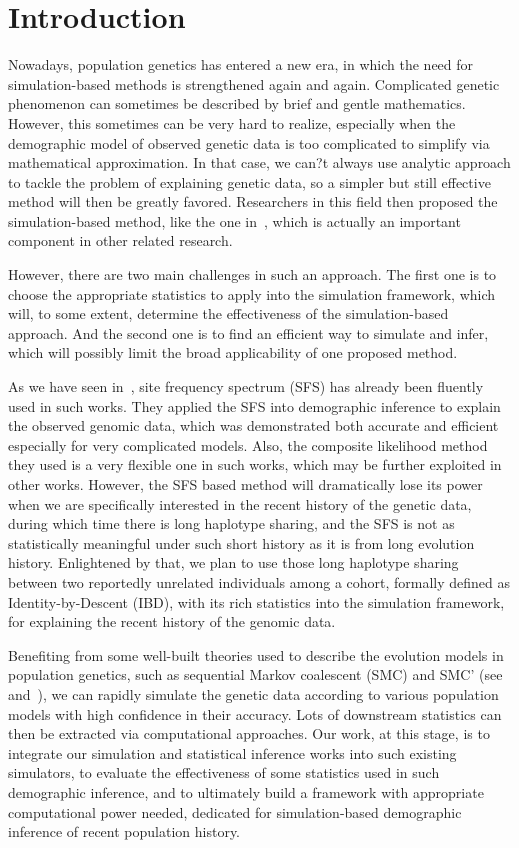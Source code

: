 \documentclass{bioinfo}
\begin{document}
\section{Introduction}

Nowadays, population genetics has entered a new era, in which the need for simulation-based methods is strengthened again and again. Complicated genetic phenomenon can sometimes be described by brief and gentle mathematics. However, this sometimes can be very hard to realize, especially when the demographic model of observed genetic data is too complicated to simplify via mathematical approximation. In that case, we can?t always use analytic approach to tackle the problem of explaining genetic data, so a simpler but still effective method will then be greatly favored. Researchers in this field then proposed the simulation-based method, like the one in~\cite{Excoffier2013}, which is actually an important component in other related research.

However, there are two main challenges in such an approach. The first one is to choose the appropriate statistics to apply into the simulation framework, which will, to some extent, determine the effectiveness of the simulation-based approach. And the second one is to find an efficient way to simulate and infer, which will possibly limit the broad applicability of one proposed method.

As we have seen in~\cite{Excoffier2013}, site frequency spectrum (SFS) has already been fluently used in such works. They applied the SFS into demographic inference to explain the observed genomic data, which was demonstrated both accurate and efficient especially for very complicated models. Also, the composite likelihood method they used is a very flexible one in such works, which may be further exploited in other works. However, the SFS based method will dramatically lose its power when we are specifically interested in the recent history of the genetic data, during which time there is long haplotype sharing, and the SFS is not as statistically meaningful under such short history as it is from long evolution history. Enlightened by that, we plan to use those long haplotype sharing between two reportedly unrelated individuals among a cohort, formally defined as Identity-by-Descent (IBD), with its rich statistics into the simulation framework, for explaining the recent history of the genomic data.

Benefiting from some well-built theories used to describe the evolution models in population genetics, such as sequential Markov coalescent (SMC) and SMC' (see~\cite{McVean2005} and~\cite{Marjoram2006}), we can rapidly simulate the genetic data according to various population models with high confidence in their accuracy. Lots of downstream statistics can then be extracted via computational approaches. Our work, at this stage, is to integrate our simulation and statistical inference works into such existing simulators, to evaluate the effectiveness of some statistics used in such demographic inference, and to ultimately build a framework with appropriate computational power needed, dedicated for simulation-based demographic inference of recent population history.
\end{document}
